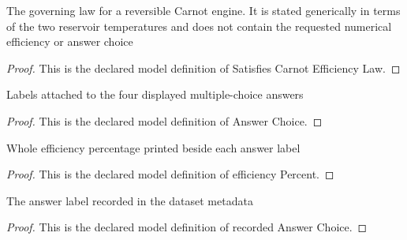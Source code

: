 \begin{definition}
  \label{def:physics:phyx-mini-0493:phyxminiproblems-problemphyxmini0493-satisfiescarnotefficiencylaw}
  The governing law for a reversible Carnot engine. It is stated generically in terms of the two reservoir temperatures and does not contain the requested numerical efficiency or answer choice
\end{definition}
\begin{proof}
  This is the declared model definition of Satisfies Carnot Efficiency Law.
\end{proof}
\begin{definition}
  \label{def:physics:phyx-mini-0493:phyxminiproblems-problemphyxmini0493-answerchoice}
  Labels attached to the four displayed multiple-choice answers
\end{definition}
\begin{proof}
  This is the declared model definition of Answer Choice.
\end{proof}
\begin{definition}
  \label{def:physics:phyx-mini-0493:phyxminiproblems-problemphyxmini0493-answerchoice-efficiencypercent}
  Whole efficiency percentage printed beside each answer label
\end{definition}
\begin{proof}
  This is the declared model definition of efficiency Percent.
\end{proof}
\begin{definition}
  \label{def:physics:phyx-mini-0493:phyxminiproblems-problemphyxmini0493-recordedanswerchoice}
  The answer label recorded in the dataset metadata
\end{definition}
\begin{proof}
  This is the declared model definition of recorded Answer Choice.
\end{proof}
